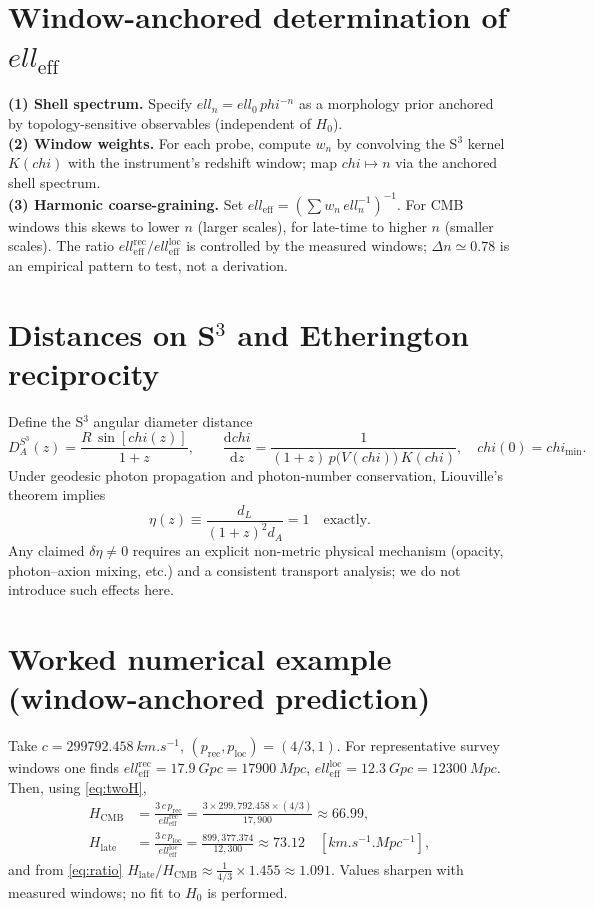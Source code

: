 \documentclass[
  onecolumn,
  amsmath,amssymb,
  aps,
  prd,
  superscriptaddress,
  nofootinbib,
  longbibliography
]{revtex4-2}
\newcommand{\vp}{\varphi}
\newcommand{\ellEff}{\ell_{\mathrm{eff}}}
\newcommand{\ellRec}{\ell_{\mathrm{eff}}^{\mathrm{rec}}}
\newcommand{\ellLoc}{\ell_{\mathrm{eff}}^{\mathrm{loc}}}
\newcommand{\pRec}{p_{\mathrm{rec}}}
\newcommand{\pLoc}{p_{\mathrm{loc}}}
\newcommand{\Hlate}{H_{\mathrm{late}}}
\newcommand{\HCMB}{H_{\mathrm{CMB}}}
\def\varphi{phi}%
\def\chi{chi}%
\def\ell{ell}%
\begin{document}
\section{Window-anchored determination of $\ell_{\mathrm{eff}}$}
\textbf{(1) Shell spectrum.} Specify $\ell_n=\ell_0\,\vp^{-n}$ as a morphology prior anchored by topology-sensitive observables (independent of $H_0$).\\
\textbf{(2) Window weights.} For each probe, compute $w_n$ by convolving the S$^3$ kernel $K(\chi)$ with the instrument's redshift window; map $\chi\mapsto n$ via the anchored shell spectrum.\\
\textbf{(3) Harmonic coarse-graining.} Set $\ellEff=(\sum w_n\,\ell_n^{-1})^{-1}$. For CMB windows this skews to lower $n$ (larger scales), for late-time to higher $n$ (smaller scales). The ratio $\ellRec/\ellLoc$ is controlled by the measured windows; $\Delta n\simeq0.78$ is an empirical pattern to test, not a derivation.

\section{Distances on S$^3$ and Etherington reciprocity}
Define the S$^3$ angular diameter distance
\begin{equation}
D_A^{S^3}(z)=\frac{R\,\sin[\chi(z)]}{1+z},\qquad
\frac{\mathrm{d}\chi}{\mathrm{d}z}
=\frac{1}{(1+z)\,p\!\big(V(\chi)\big)\,K(\chi)},\quad
\chi(0)=\chi_{\min}.
\end{equation}
Under geodesic photon propagation and photon-number conservation, Liouville's theorem implies
\begin{equation}
\eta(z)\equiv \frac{d_L}{(1+z)^2 d_A}=1 \quad \text{exactly}.
\end{equation}
Any claimed $\delta\eta\neq 0$ requires an explicit non-metric physical mechanism (opacity, photon–axion mixing, etc.) and a consistent transport analysis; we do not introduce such effects here.

\section{Worked numerical example (window-anchored prediction)}
Take $c=\SI{299792.458}{km.s^{-1}}$, $(\pRec,\pLoc)=(4/3,1)$. For representative survey windows one finds
$\ellRec=\SI{17.9}{Gpc}=\SI{17900}{Mpc}$,
$\ellLoc=\SI{12.3}{Gpc}=\SI{12300}{Mpc}$.
Then, using \eqref{eq:twoH},
\begin{align}
\HCMB&=\frac{3\,c\,\pRec}{\ellRec}
=\frac{3\times 299{,}792.458\times (4/3)}{17{,}900}
\approx \mathbf{66.99},\\
\Hlate&=\frac{3\,c\,\pLoc}{\ellLoc}
=\frac{899{,}377.374}{12{,}300}
\approx \mathbf{73.12}\quad [\si{km.s^{-1}.Mpc^{-1}}],
\end{align}
and from \eqref{eq:ratio}
$\Hlate/\HCMB\approx \tfrac{1}{4/3}\times 1.455\approx \mathbf{1.091}$. Values sharpen with measured windows; no fit to $H_0$ is performed.
\end{document}
